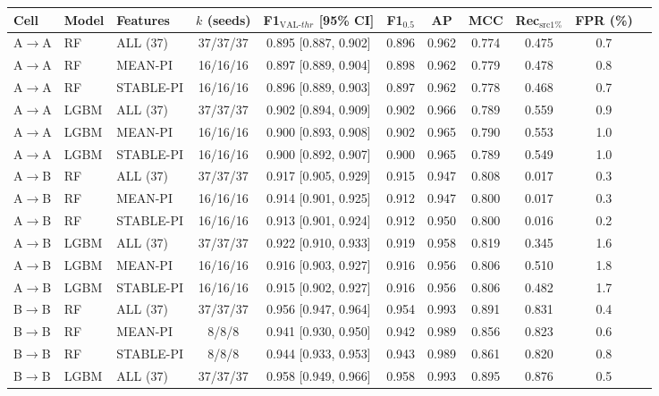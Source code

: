 \begin{tabular}{lllcccccccc}
\toprule
Cell & Model & Features & $k$ (seeds) & F1$_{\mathrm{VAL}\text{-}thr}$ [95\% CI] & F1$_{0.5}$ & AP & MCC & Rec$_{\mathrm{src}1\%}$ & FPR (\%) \\
\midrule
A$\rightarrow$A & RF & ALL (37) & 37/37/37 & 0.895 [0.887, 0.902] & 0.896 & 0.962 & 0.774 & 0.475 & 0.7 \\
A$\rightarrow$A & RF & MEAN-PI & 16/16/16 & 0.897 [0.889, 0.904] & 0.898 & 0.962 & 0.779 & 0.478 & 0.8 \\
A$\rightarrow$A & RF & STABLE-PI & 16/16/16 & 0.896 [0.889, 0.903] & 0.897 & 0.962 & 0.778 & 0.468 & 0.7 \\
A$\rightarrow$A & LGBM & ALL (37) & 37/37/37 & 0.902 [0.894, 0.909] & 0.902 & 0.966 & 0.789 & 0.559 & 0.9 \\
A$\rightarrow$A & LGBM & MEAN-PI & 16/16/16 & 0.900 [0.893, 0.908] & 0.902 & 0.965 & 0.790 & 0.553 & 1.0 \\
A$\rightarrow$A & LGBM & STABLE-PI & 16/16/16 & 0.900 [0.892, 0.907] & 0.900 & 0.965 & 0.789 & 0.549 & 1.0 \\
\midrule
A$\rightarrow$B & RF & ALL (37) & 37/37/37 & 0.917 [0.905, 0.929] & 0.915 & 0.947 & 0.808 & 0.017 & 0.3 \\
A$\rightarrow$B & RF & MEAN-PI & 16/16/16 & 0.914 [0.901, 0.925] & 0.912 & 0.947 & 0.800 & 0.017 & 0.3 \\
A$\rightarrow$B & RF & STABLE-PI & 16/16/16 & 0.913 [0.901, 0.924] & 0.912 & 0.950 & 0.800 & 0.016 & 0.2 \\
A$\rightarrow$B & LGBM & ALL (37) & 37/37/37 & 0.922 [0.910, 0.933] & 0.919 & 0.958 & 0.819 & 0.345 & 1.6 \\
A$\rightarrow$B & LGBM & MEAN-PI & 16/16/16 & 0.916 [0.903, 0.927] & 0.916 & 0.956 & 0.806 & 0.510 & 1.8 \\
A$\rightarrow$B & LGBM & STABLE-PI & 16/16/16 & 0.915 [0.902, 0.927] & 0.916 & 0.956 & 0.806 & 0.482 & 1.7 \\
\midrule
B$\rightarrow$B & RF & ALL (37) & 37/37/37 & 0.956 [0.947, 0.964] & 0.954 & 0.993 & 0.891 & 0.831 & 0.4 \\
B$\rightarrow$B & RF & MEAN-PI & 8/8/8 & 0.941 [0.930, 0.950] & 0.942 & 0.989 & 0.856 & 0.823 & 0.6 \\
B$\rightarrow$B & RF & STABLE-PI & 8/8/8 & 0.944 [0.933, 0.953] & 0.943 & 0.989 & 0.861 & 0.820 & 0.8 \\
B$\rightarrow$B & LGBM & ALL (37) & 37/37/37 & 0.958 [0.949, 0.966] & 0.958 & 0.993 & 0.895 & 0.876 & 0.5 \\

\end{tabular}
